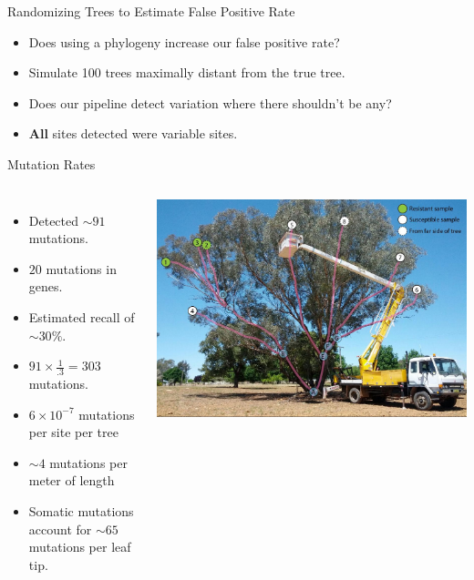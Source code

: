 \documentclass{beamer}
\begin{document}
\begin{frame}{Randomizing Trees to Estimate False Positive Rate}
	\begin{itemize}
		\item Does using a phylogeny increase our false positive rate?
		\item Simulate 100 trees maximally distant from the true tree.
		\item Does our pipeline detect variation where there shouldn't be any?
		\item \textbf{All} sites detected were variable sites.
	\end{itemize}
\end{frame}

\begin{frame}{Mutation Rates}
\begin{columns}
\begin{itemize}
\item Detected $\sim91$ mutations.
\item $20$ mutations in genes.
\item Estimated recall of $\sim30\%$.
\item $91\times\frac{1}{.3}=303$ mutations.
\item $6\times10^{-7}$ mutations per site per tree
\item $\sim4$ mutations per meter of length
\item Somatic mutations account for $\sim65$ mutations per leaf tip.
\end{itemize}
\includegraphics[width=\linewidth]{labeled_nodes_tree.jpg}
\end{columns}
\end{frame}
\end{document}
